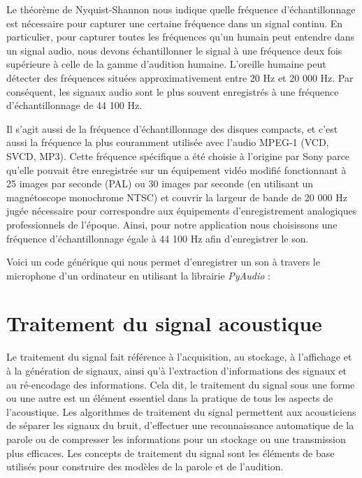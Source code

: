 \documentclass[11pt, report, french]{scrreprt}
\begin{document}
Le théorème de Nyquist-Shannon nous indique quelle fréquence d'échantillonnage est nécessaire pour capturer une certaine fréquence dans un signal continu. En particulier, pour capturer toutes les fréquences qu'un humain peut entendre dans un signal audio, nous devons échantillonner le signal à une fréquence deux fois supérieure à celle de la gamme d'audition humaine. L'oreille humaine peut détecter des fréquences situées approximativement entre 20 Hz et 20 000 Hz. Par conséquent, les signaux audio sont le plus souvent enregistrés à une fréquence d'échantillonnage de 44 100 Hz.\\\par

Il s'agit aussi de la fréquence d'échantillonnage des disques compacts, et c'est aussi la fréquence la plus couramment utilisée avec l'audio MPEG-1 (VCD, SVCD, MP3). Cette fréquence spécifique a été choisie à l'origine par Sony parce qu'elle pouvait être enregistrée sur un équipement vidéo modifié fonctionnant à 25 images par seconde (PAL) ou 30 images par seconde (en utilisant un magnétoscope monochrome NTSC) et couvrir la largeur de bande de 20 000 Hz jugée nécessaire pour correspondre aux équipements d'enregistrement analogiques professionnels de l'époque. Ainsi, pour notre application nous choisissons une fréquence d'échantillonnage égale à 44 100 Hz afin d'enregistrer le son.\\\par

Voici un code générique qui nous permet d'enregistrer un son à travers le microphone d'un ordinateur en utilisant la librairie \textit{PyAudio} :\\



\chapter{Traitement du signal acoustique}
\label{dsp}
Le traitement du signal fait référence à l'acquisition, au stockage, à l'affichage et à la génération de signaux, ainsi qu'à l'extraction d'informations des signaux et au ré-encodage des informations. Cela dit, le traitement du signal sous une forme ou une autre est un élément essentiel dans la pratique de tous les aspects de l'acoustique. Les algorithmes de traitement du signal permettent aux acousticiens de séparer les signaux du bruit, d'effectuer une reconnaissance automatique de la parole ou de compresser les informations pour un stockage ou une transmission plus efficaces. Les concepts de traitement du signal sont les éléments de base utilisés pour construire des modèles de la parole et de l'audition.\\\par
\end{document}
